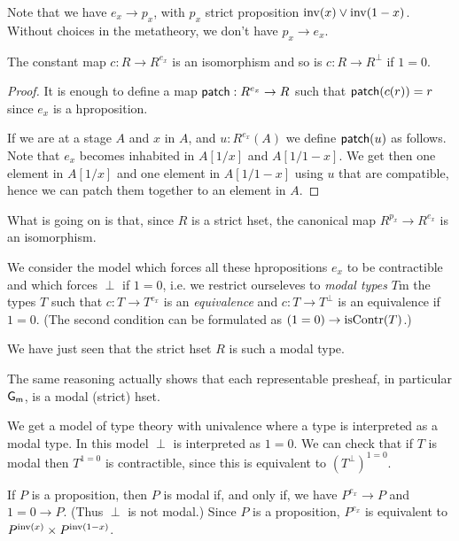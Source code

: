 Note that we have $e_x\rightarrow p_x$, with $p_x$ strict proposition $\mathrm{inv}(x)\vee \mathrm{inv}(1-x)$.
Without choices in the metatheory, we don't have $p_x\rightarrow e_x$.

\begin{lemma}
  The constant map $c:R\rightarrow R^{e_x}$ is an isomorphism and so is $c:R\rightarrow R^{\perp}$ if
  $1 = 0$.
\end{lemma}

\begin{proof}
  It is enough to define a map $\mathsf{patch}:R^{e_x}\rightarrow R$ such that $\mathsf{patch}(c(r)) = r$ since
  $e_x$ is a hproposition.

  If we are at a stage $A$ and $x$ in $A$, and $u:R^{e_x}(A)$ we define $\mathsf{patch}(u)$ as follows.
  Note that $e_x$ becomes inhabited in $A[1/x]$ and $A[1/1-x]$. We get then one element in $A[1/x]$
  and one element in $A[1/1-x]$ using $u$ that are compatible, hence we can patch them together to
  an element in $A$.
\end{proof}

What is going on is that, since $R$ is a strict hset, the canonical map $R^{p_x}\rightarrow R^{e_x}$ is
an isomorphism.

We consider the model which forces all these hpropositions $e_x$ to be contractible
and which forces $\perp$ if $1 = 0$, i.e. we restrict ourseleves to {\em modal types} $T$m the types
$T$ such that $c:T\rightarrow T^{e_x}$ is an {\em equivalence} and $c:T\rightarrow T^{\perp}$ is an equivalence
if $1=0$. (The second condition can be formulated as $(1=0)\rightarrow \mathrm{isContr}(T)$.)

\medskip

We have just seen that the strict hset $R$ is such a modal type.

The same reasoning actually shows that each representable presheaf, in particular $\mathsf{G_m}$, is a modal
(strict) hset.

\medskip

We get a model of type theory with univalence where a type is interpreted as a modal type.
In this model $\perp$ is interpreted as $1=0$. We can check that if $T$ is modal then
$T^{1=0}$ is contractible, since this is equivalent to $(T^{\perp})^{1=0}$.

\medskip

If $P$ is a proposition, then $P$ is modal if, and only if,
we have $P^{e_x}\rightarrow P$ and $1=0\rightarrow P$. (Thus $\perp$ is not modal.)
Since $P$ is a
proposition, $P^{e_x}$ is equivalent to $P^{\mathrm{inv}(x)}\times P^{\mathrm{inv}(1-x)}$.

